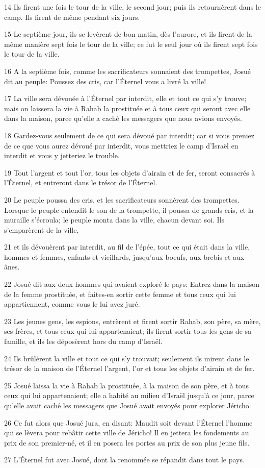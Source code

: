 \par 14 Ils firent une fois le tour de la ville, le second jour; puis ils retournèrent dans le camp. Ils firent de même pendant six jours.
\par 15 Le septième jour, ils se levèrent de bon matin, dès l'aurore, et ils firent de la même manière sept fois le tour de la ville; ce fut le seul jour où ils firent sept fois le tour de la ville.
\par 16 A la septième fois, comme les sacrificateurs sonnaient des trompettes, Josué dit au peuple: Poussez des cris, car l'Éternel vous a livré la ville!
\par 17 La ville sera dévouée à l'Éternel par interdit, elle et tout ce qui s'y trouve; mais on laissera la vie à Rahab la prostituée et à tous ceux qui seront avec elle dans la maison, parce qu'elle a caché les messagers que nous avions envoyés.
\par 18 Gardez-vous seulement de ce qui sera dévoué par interdit; car si vous preniez de ce que vous aurez dévoué par interdit, vous mettriez le camp d'Israël en interdit et vous y jetteriez le trouble.
\par 19 Tout l'argent et tout l'or, tous les objets d'airain et de fer, seront consacrés à l'Éternel, et entreront dans le trésor de l'Éternel.
\par 20 Le peuple poussa des cris, et les sacrificateurs sonnèrent des trompettes. Lorsque le peuple entendit le son de la trompette, il poussa de grands cris, et la muraille s'écroula; le peuple monta dans la ville, chacun devant soi. Ils s'emparèrent de la ville,
\par 21 et ils dévouèrent par interdit, au fil de l'épée, tout ce qui était dans la ville, hommes et femmes, enfants et vieillards, jusqu'aux boeufs, aux brebis et aux ânes.
\par 22 Josué dit aux deux hommes qui avaient exploré le pays: Entrez dans la maison de la femme prostituée, et faites-en sortir cette femme et tous ceux qui lui appartiennent, comme vous le lui avez juré.
\par 23 Les jeunes gens, les espions, entrèrent et firent sortir Rahab, son père, sa mère, ses frères, et tous ceux qui lui appartenaient; ils firent sortir tous les gens de sa famille, et ils les déposèrent hors du camp d'Israël.
\par 24 Ils brûlèrent la ville et tout ce qui s'y trouvait; seulement ils mirent dans le trésor de la maison de l'Éternel l'argent, l'or et tous les objets d'airain et de fer.
\par 25 Josué laissa la vie à Rahab la prostituée, à la maison de son père, et à tous ceux qui lui appartenaient; elle a habité au milieu d'Israël jusqu'à ce jour, parce qu'elle avait caché les messagers que Josué avait envoyés pour explorer Jéricho.
\par 26 Ce fut alors que Josué jura, en disant: Maudit soit devant l'Éternel l'homme qui se lèvera pour rebâtir cette ville de Jéricho! Il en jettera les fondements au prix de son premier-né, et il en posera les portes au prix de son plus jeune fils.
\par 27 L'Éternel fut avec Josué, dont la renommée se répandit dans tout le pays.

